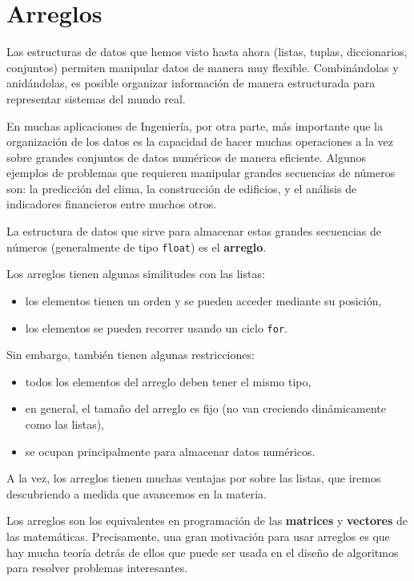 \chapter{Arreglos}

Las estructuras de datos que hemos visto hasta ahora (listas, tuplas,
diccionarios, conjuntos) permiten manipular datos de manera muy
flexible. Combinándolas y anidándolas, es posible organizar información
de manera estructurada para representar sistemas del mundo real.

En muchas aplicaciones de Ingeniería, por otra parte, más importante que
la organización de los datos es la capacidad de hacer muchas operaciones
a la vez sobre grandes conjuntos de datos numéricos de manera eficiente.
Algunos ejemplos de problemas que requieren manipular grandes secuencias
de números son: la predicción del clima, la construcción de edificios, y
el análisis de indicadores financieros entre muchos otros.

La estructura de datos que sirve para almacenar estas grandes secuencias
de números (generalmente de tipo \lstinline!float!) es el
\textbf{arreglo}.

Los arreglos tienen algunas similitudes con las listas:

\begin{itemize}
\item
  los elementos tienen un orden y se pueden acceder mediante su
  posición,
\item
  los elementos se pueden recorrer usando un ciclo \lstinline!for!.
\end{itemize}

Sin embargo, también tienen algunas restricciones:

\begin{itemize}
\item
  todos los elementos del arreglo deben tener el mismo tipo,
\item
  en general, el tamaño del arreglo es fijo (no van creciendo
  dinámicamente como las listas),
\item
  se ocupan principalmente para almacenar datos numéricos.
\end{itemize}

A la vez, los arreglos tienen muchas ventajas por sobre las listas, que
iremos descubriendo a medida que avancemos en la materia.

Los arreglos son los equivalentes en programación de las
\textbf{matrices} y \textbf{vectores} de las matemáticas. Precisamente,
una gran motivación para usar arreglos es que hay mucha teoría detrás de
ellos que puede ser usada en el diseño de algoritmos para resolver
problemas interesantes.

